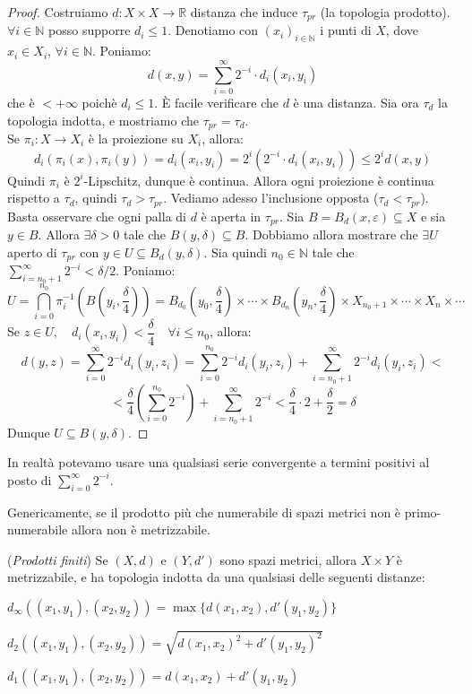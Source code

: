 \begin{proof}
	Costruiamo $d:X \times X \longrightarrow \mathbb{R}$ distanza che induce
	$\tau _{pr}$ (la topologia prodotto). $\forall i \in \mathbb{N}		$ posso
	supporre $d_i \le 1$. Denotiamo con $(x_i)_{i \in \mathbb{N}}$ i punti di
	$X$, dove $x_i \in X_i$, $\forall i \in \mathbb{N}$. 				Poniamo:
	$$d(x,y)=\sum _{i=0}^\infty 2^{-i} \cdot d_i(x_i,y_i)$$
	che è $<+\infty$ poichè $d_i \le 1$. È facile verificare che $d$ è una
	distanza. Sia ora $\tau _d$ la topologia indotta, e mostriamo che $		\tau
	_{pr} =\tau _d$.\\
	Se $\pi _i:X \longrightarrow X_i$ è la proiezione su $X_i$, allora:
	$$d_i(\pi _i(x),\pi _i(y))=d_i(x_i,y_i)=2^i(2^{-i} \cdot d_i(x_i,y_i)) \le
	2^i d(x,y)$$
	Quindi $\pi _i$ è $2^i$-Lipschitz, dunque è continua. Allora ogni proiezione
	è continua rispetto a $\tau _d$, quindi $\tau _d >\tau _{pr}$. 		Vediamo
	adesso l'inclusione opposta ($\tau _d < \tau _{pr}$).\\
	Basta osservare che ogni palla di $d$ è aperta in $\tau _{pr}$. Sia
	$B=B_d(x,\varepsilon) \subseteq X$ e sia $y \in B$. Allora $\exists
	\delta >0$ tale che $B(y,\delta) \subseteq B$. Dobbiamo allora mostrare che
	$\exists U$ aperto di $\tau _{pr}$ con $y \in U \subseteq B_d(y,\delta)$.
	Sia quindi $n_0 \in \mathbb{N}$ tale che $\sum _{i=n_0+1}^\infty 2^{-i} <
	\delta /2$. Poniamo:
	$$U=\bigcap _{i=0}^{n_0} \pi _i ^{-1} \left( B\left(
	y_i,\dfrac{\delta}{4}\right) \right) =B_{d_0}\left( y_0,
	\dfrac{\delta}{4}\right) \times \cdots		\times B_{d_n}\left(
	y_n,\dfrac{\delta}{4}\right) \times X_{n_0+1} \times \cdots \times X_n
	\times \cdots$$
	Se $z \in U, \quad d_i(x_i,y_i) < \dfrac{\delta}{4} \quad \forall i \le
	n_0$, allora:
	$$d(y,z)=\sum _{i=0}^\infty 2^{-i} d_i(y_i,z_i)=\sum _{i=0}^{n_0} 2^{-i}
	d_i(y_i,z_i)+\sum _{i=n_0+1}^\infty 2^{-i} d_i(y_i,z_i)<$$
	$$<\dfrac{\delta}{4}\left( \sum _{i=0}^{n_0}2^{-i} \right) +\sum
	_{i=n_0+1}^\infty 2^{-i} < \dfrac{\delta}{4} \cdot
	2+\dfrac{\delta}{2}=\delta		$$
	Dunque $U \subseteq B(y,\delta)$.
\end{proof}
\begin{oss}
	In realtà potevamo usare una qualsiasi serie convergente a termini positivi
	al posto di $\sum _{i=0}^\infty 2^{-i}$.
\end{oss}
\begin{oss}
	Genericamente, se il prodotto più che numerabile di spazi metrici non è
	primo-numerabile allora non è metrizzabile.
\end{oss}
\begin{prop}(\emph{Prodotti finiti})
	Se $(X,d)$ e $(Y,d')$ sono spazi metrici, allora $X \times Y$ è
	metrizzabile, e ha topologia indotta da una qualsiasi delle seguenti
	distanze:
	\begin{nlist}
	\item $d_\infty ((x_1,y_1),(x_2,y_2))=\max \{d(x_1,x_2),d'(y_1,y_2)\}$
	\item $d_2 ((x_1,y_1),(x_2,y_2))=\sqrt{d(x_1,x_2)^2+d'(y_1,y_2)^2}$
	\item $d_1 ((x_1,y_1),(x_2,y_2))=d(x_1,x_2)+d'(y_1,y_2)$
	\end{nlist}
\end{prop}
